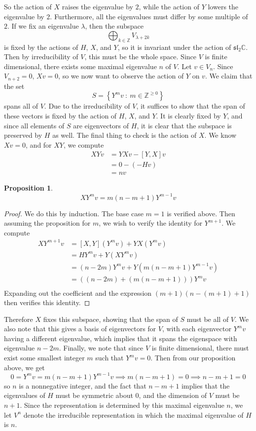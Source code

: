 \documentclass[psamsfonts]{amsart}
\newtheorem{prop}[thm]{Proposition}
\theoremstyle{definition}
\theoremstyle{remark}
\renewcommand{\sl}{\mathfrak{sl}}
\newcommand{\Z}{\mathbb{Z}}
\newcommand{\C}{\mathbb{C}}
\newcommand{\set}[1]{\left\lbrace #1 \right\rbrace}
\begin{document}
%
So the action of $X$ raises the eigenvalue by $2$, while the action of $Y$ lowers
the eigenvalue by $2$. Furthermore, all the eigenvalues must differ by some
multiple of $2$. If we fix an eigenvalue $\lambda$, then the subspace
\[
\bigoplus_{k \in \Z}V_{\lambda + 2k}
\]
is fixed by the actions of $H$, $X$, and $Y$, so it is invariant under the action
of $\sl_2\C$. Then by irreducibility of $V$, this must be the whole space.
Since $V$ is finite dimensional, there exists some maximal eigenvalue $n$ of $V$.
Let $v \in V_n$. Since $V_{n+2} = 0$, $Xv = 0$, so we now want to observe the action
of $Y$ on $v$. We claim that the set
\[
S = \set{Y^mv ~:~ m \in \Z^{\geq 0}}
\]
spans all of $V$. Due to the irreducibility of $V$, it suffices to show that
the span of these vectors is fixed by the action of $H$, $X$, and $Y$. It is
clearly fixed by $Y$, and since all elements of $S$ are eigenvectors of $H$, it
is clear that the subspace is preserved by $H$ as well. The final thing to
check is the action of $X$. We know $Xv = 0$, and for $XY$, we compute
%
\begin{align*}
XYv &= YXv - [Y,X]v \\
&= 0 - (-Hv) \\
&= nv
\end{align*}
%
\begin{prop}
\[
XY^mv = m(n-m+1)Y^{m-1}v
\]
\end{prop}
%
\begin{proof}
We do this by induction. The base case $m = 1$ is verified above. Then assuming
the proposition for $m$, we wish to verify the identity for $Y^{m+1}$. We compute
\begin{align*}
XY^{m+1}v &= [X,Y](Y^mv) + YX(Y^mv) \\
&= HY^mv + Y(XY^m v) \\
&= (n-2m)Y^mv + Y(m(n-m+1)Y^{m-1}v) \\
&= ((n-2m)+ (m(n-m+1)))Y^mv \\
\end{align*}
Expanding out the coefficient and the expression $(m+1)(n-(m+1)+1)$ then verifies
this identity.
\end{proof}
%
Therefore $X$ fixes this subspace, showing that the span of $S$ must be all of $V$.
We also note that this gives a basis of eigenvectors for $V$, with each eigenvector
$Y^mv$ having a different eigenvalue, which implies that it spans the eigenspace
with eigenvalue $n - 2m$. Finally, we note that since $V$ is finite dimensional,
there must exist some smallest integer $m$ such that $Y^mv = 0$. Then from our
proposition above, we get
\[
0 = Y^mv = m(n - m + 1)Y^{m-1}v \implies m(n-m+1) = 0 \implies n-m+1 = 0
\]
so $n$ is a nonnegative integer, and the fact that $n-m+1$ implies that the
eigenvalues of $H$ must be symmetric about $0$, and the dimension of $V$ must
be $n+1$. Since the representation is determined by this maximal eigenvalue $n$,
we let $V^n$ denote the irreducible representation in which the maximal eigenvalue
of $H$ is $n$.
\end{document}
